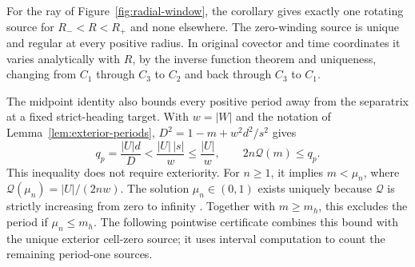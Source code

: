 \documentclass[11pt,a4paper]{article}
\theoremstyle{remark}\newtheorem{remark}[theorem]{Remark}
\begin{document}
For the ray of Figure~\ref{fig:radial-window}, the corollary gives exactly
one rotating source for $R_-<R<R_+$ and none elsewhere.
The zero-winding source is unique and regular at every positive radius.
In original covector and time coordinates it varies analytically with
$R$, by the inverse function theorem and uniqueness, changing from $C_1$
through $C_3$ to $C_2$ and back through $C_3$ to $C_1$.

The midpoint identity also bounds every positive period away from the
separatrix at a fixed strict-heading target. With $w=|W|$ and the
notation of Lemma~\ref{lem:exterior-periods},
$D^2=1-m+w^2d^2/s^2$ gives
\begin{equation}\label{eq:positive-period-modulus}
 q_p=\frac{|U|d}{D}<\frac{|U|\,|s|}{w}\le\frac{|U|}{w},
 \qquad 2n\mathcal Q(m)\le q_p.
\end{equation}
This inequality does not require exteriority. For $n\ge1$, it implies
$m<\mu_n$, where $\mathcal Q(\mu_n)=|U|/(2nw)$.
The solution $\mu_n\in(0,1)$ exists uniquely because $\mathcal Q$ is
strictly increasing from zero to infinity \cite[Sections 19.4, 19.12]{DLMF}.
Together with $m\ge m_h$, this excludes the period if $\mu_n\le m_h$.
The following pointwise certificate combines this bound with the unique
exterior cell-zero source; it uses interval computation to count the
remaining period-one sources.
\end{document}
